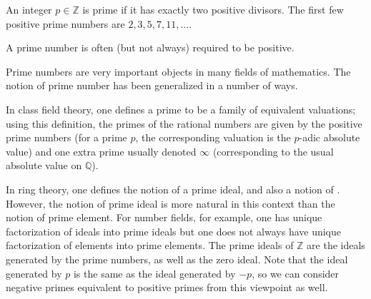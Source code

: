 \documentclass[12pt]{article}
\begin{document}
An integer $p \in \mathbb{Z}$ is prime if it has exactly two positive divisors. The first few positive prime numbers are $2, 3, 5, 7, 11, \dots$.

A prime number is often (but not always) required to be positive.

Prime numbers are very important objects in many fields of mathematics.  The notion of prime number has been generalized in a number of ways.  

In class field theory, one defines a prime to be a family of equivalent valuations; using this definition, the primes of the rational numbers are given by the positive prime numbers (for a prime $p$, the corresponding valuation is the $p$-adic absolute value) and one extra prime usually denoted $\infty$ (corresponding to the usual absolute value on $\mathbb{Q}$). 

In ring theory, one defines the notion of a prime ideal, and also a notion of .  However, the notion of prime ideal is more natural in this context than the notion of prime element.  For number fields, for example, one has unique factorization of ideals into prime ideals but one does not always have unique factorization of elements into prime elements.  The prime ideals of $\mathbb{Z}$ are the ideals generated by the prime numbers, as well as the zero ideal.  Note that the ideal generated by $p$ is the same as the ideal generated by $-p$, so we can consider negative primes equivalent to positive primes from this viewpoint as well.
\end{document}
